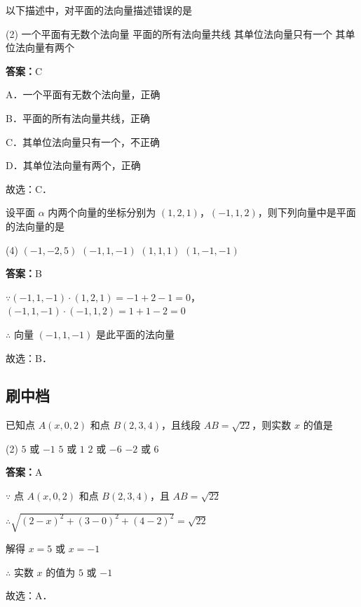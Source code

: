 \vspace{2em}


\begin{example}[\bkstar{1}{5}]
以下描述中，对平面的法向量描述错误的是
\begin{tasks}(2)
    \task 一个平面有无数个法向量
    \task 平面的所有法向量共线
    \task 其单位法向量只有一个
    \task 其单位法向量有两个
\end{tasks}
\end{example}
\begin{solution}
\textbf{答案：}C

A．一个平面有无数个法向量，正确

B．平面的所有法向量共线，正确

C．其单位法向量只有一个，不正确

D．其单位法向量有两个，正确

故选：C．
\end{solution}

\vspace{2em}

\begin{example}[\bkstar{2}{5}]
设平面 $\alpha$ 内两个向量的坐标分别为 $(1,2,1)$，$(-1,1,2)$，则下列向量中是平面的法向量的是
\begin{tasks}(4)
    \task $(-1,-2,5)$
    \task $(-1,1,-1)$
    \task $(1,1,1)$
    \task $(1,-1,-1)$
\end{tasks}
\end{example}
\begin{solution}
\textbf{答案：}B

$\because (-1,1,-1)\cdot(1,2,1)=-1+2-1=0$，$(-1,1,-1)\cdot(-1,1,2)=1+1-2=0$

$\therefore$ 向量 $(-1,1,-1)$ 是此平面的法向量

故选：B．
\end{solution}

\vspace{2em}

\subsection{刷中档}

\begin{example}[\bkstar{2}{5}]
已知点 $A(x,0,2)$ 和点 $B(2,3,4)$，且线段 $AB=\sqrt{22}$，则实数 $x$ 的值是
\begin{tasks}(2)
    \task $5$ 或 $-1$
    \task $5$ 或 $1$
    \task $2$ 或 $-6$
    \task $-2$ 或 $6$
\end{tasks}
\end{example}
\begin{solution}
\textbf{答案：}A

$\because$ 点 $A(x,0,2)$ 和点 $B(2,3,4)$，且 $AB=\sqrt{22}$

$\therefore \sqrt{(2-x)^2+(3-0)^2+(4-2)^2}=\sqrt{22}$

解得 $x=5$ 或 $x=-1$

$\therefore$ 实数 $x$ 的值为 $5$ 或 $-1$

故选：A．
\end{solution}

